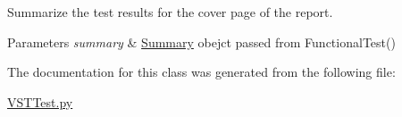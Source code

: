 Summarize the test results for the cover page of the report. 


\begin{DoxyParams}{Parameters}
{\em summary} & \hyperlink{class_v_s_t_test_1_1_summary}{Summary} obejct passed from Functional\+Test() \\
\hline
\end{DoxyParams}


The documentation for this class was generated from the following file\+:\begin{DoxyCompactItemize}
\item 
\hyperlink{_v_s_t_test_8py}{V\+S\+T\+Test.\+py}\end{DoxyCompactItemize}
